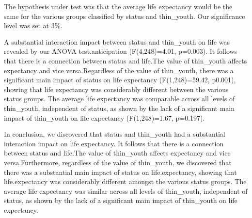 \documentclass[
]{article}
\begin{document}
The hypothesis under test was that the average life expectancy would be
the same for the various groups classified by status and thin\_youth.
Our significance level was set at 3\%.

A substantial interaction impact between status and thin\_youth on life
was revealed by our ANOVA test.anticipation (F(4,248)=4.01, p=0.003). It
follows that there is a connection between status and life.The value of
thin\_youth affects expectancy and vice versa.Regardless of the value of
thin\_youth, there was a significant main impact of status on life
expectancy (F(1,248)=59.42, p0.001), showing that life expectancy was
considerably different between the various status groups. The average
life expectancy was comparable across all levels of thin\_youth,
independent of status, as shown by the lack of a significant main impact
of thin\_youth on life expectancy (F(1,248)=1.67, p=0.197).

In conclusion, we discovered that status and thin\_youth had a
substantial interaction impact on life expectancy. It follows that there
is a connection between status and life.The value of thin\_youth affects
expectancy and vice versa.Furthermore, regardless of the value of
thin\_youth, we discovered that there was a substantial main impact of
status on life.expectancy, showing that life.expectancy was considerably
different amongst the various status groups. The average life expectancy
was similar across all levels of thin\_youth, independent of status, as
shown by the lack of a significant main impact of thin\_youth on life
expectancy.
\end{document}
